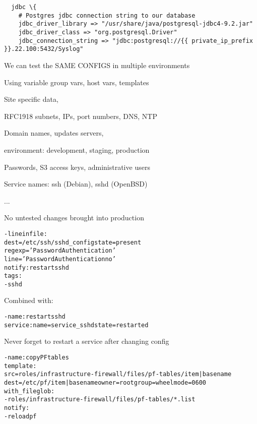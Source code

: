 \documentclass[17pt,Screen16to9,footrule]{foils}
\begin{document}

{\small\begin{verbatim}
  jdbc \{
    # Postgres jdbc connection string to our database
    jdbc_driver_library => "/usr/share/java/postgresql-jdbc4-9.2.jar"
    jdbc_driver_class => "org.postgresql.Driver"
    jdbc_connection_string => "jdbc:postgresql://{{ private_ip_prefix }}.22.100:5432/Syslog"
\end{verbatim}}


\begin{list1}
\item We can test the SAME CONFIGS in multiple environments
\item Using variable group vars, host vars, templates
\begin{list2}
\item Site specific data,
\item RFC1918 subnets, IPs, port numbers, DNS, NTP
\item Domain names, updates servers,
\item environment: development, staging, production
\item Passwords, S3 access keys, administrative users
\item Service names: ssh (Debian), sshd (OpenBSD)
\item ...
\end{list2}
\item No untested changes brought into production
\end{list1}



\begin{alltt}\small
- lineinfile:
    dest=/etc/ssh/sshd_config state=present
    regexp='PasswordAuthentication'
    line='PasswordAuthentication no'
  notify: restart sshd
  tags:
    - sshd
\end{alltt}

Combined with:
\begin{alltt}
- name: restart sshd
    service: name={{ service_sshd }} state=restarted
\end{alltt}

\vskip 1cm
\centerline{Never forget to restart a service after changing config}



\begin{alltt}\footnotesize
  - name: copy PF tables
    template:
      src=roles/infrastructure-firewall/files/pf-tables/{{ item | basename }}
      dest=/etc/pf/{{ item | basename }} owner=root group=wheel mode=0600
    with_fileglob:
        - roles/infrastructure-firewall/files/pf-tables/*.list
    notify:
      - reload pf
\end{alltt}
\end{document}
